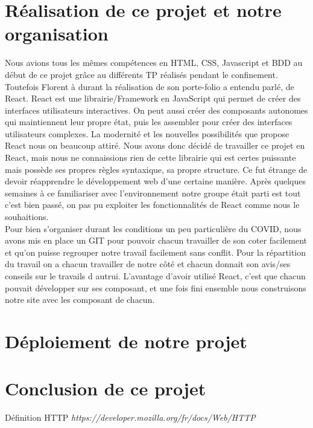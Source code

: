 \documentclass[12pt]{report}
\begin{document}
\section{Réalisation de ce projet et notre organisation}
	Nous avions tous les mêmes compétences en HTML, CSS, Javascript et BDD au début de ce projet grâce au différents TP réalisés pendant le confinement. Toutefois Florent à durant la réalisation de son porte-folio a entendu parlé, de React. React est une librairie/Framework en JavaScript qui permet de créer des interfaces utilisateurs interactives. On peut aussi créer des composants autonomes qui maintiennent leur propre état, puis les assembler pour créer des interfaces utilisateurs complexes. La modernité et les nouvelles possibilités que propose React nous on beaucoup attiré. Nous avons donc décidé de travailler ce projet en React, mais nous ne connaissions rien de cette librairie qui est certes puissante mais possède ses propres règles syntaxique, sa propre structure. Ce fut étrange de devoir réapprendre le développement web d'une certaine manière. Après quelques semaines à ce familiariser avec l'environnement notre groupe était parti est tout c'est bien passé, on pas pu exploiter les fonctionnalités de React comme nous le souhaitions. \\
	Pour bien s'organiser durant les conditions un peu particulière du COVID, nous avons mis en place un GIT pour pouvoir chacun travailler de son coter facilement et qu'on puisse regrouper notre travail facilement sans conflit.
	Pour la répartition du travail on a chacun travailler de notre côté et chacun donnait son avis/ses conseils sur le travails d autrui. L'avantage d'avoir utilisé React, c'est que chacun pouvait développer sur ses composant, et une fois fini ensemble nous construisons notre site avec les composant de chacun.
\section{Déploiement de notre projet}

\section{Conclusion de ce projet}

			\begin{thebibliography}{10}
			Définition HTTP
			\emph{https://developer.mozilla.org/fr/docs/Web/HTTP}
			
		\end{thebibliography}
\end{document}
